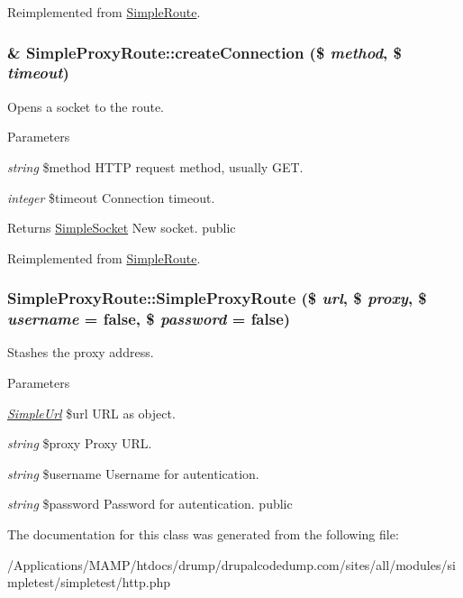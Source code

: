 Reimplemented from \hyperlink{class_simple_route_a7480c99e9ebcac13f1d84b4eb676f02d}{SimpleRoute}.\hypertarget{class_simple_proxy_route_a1741241e4a4d7ed555adf373008c7cf0}{
\subsubsection[{createConnection}]{\setlength{\rightskip}{0pt plus 5cm}\& SimpleProxyRoute::createConnection (\$ {\em method}, \/  \$ {\em timeout})}}
\label{class_simple_proxy_route_a1741241e4a4d7ed555adf373008c7cf0}
Opens a socket to the route. 
\begin{DoxyParams}{Parameters}
\item[{\em string}]\$method HTTP request method, usually GET. \item[{\em integer}]\$timeout Connection timeout. \end{DoxyParams}
\begin{DoxyReturn}{Returns}
\hyperlink{class_simple_socket}{SimpleSocket} New socket.  public 
\end{DoxyReturn}


Reimplemented from \hyperlink{class_simple_route_a686424eff035f1a37bbf13e997a072af}{SimpleRoute}.\hypertarget{class_simple_proxy_route_ae9dd2dbfe339569ce5fb6a68162de1a9}{
\subsubsection[{SimpleProxyRoute}]{\setlength{\rightskip}{0pt plus 5cm}SimpleProxyRoute::SimpleProxyRoute (\$ {\em url}, \/  \$ {\em proxy}, \/  \$ {\em username} = {\ttfamily false}, \/  \$ {\em password} = {\ttfamily false})}}
\label{class_simple_proxy_route_ae9dd2dbfe339569ce5fb6a68162de1a9}
Stashes the proxy address. 
\begin{DoxyParams}{Parameters}
\item[{\em \hyperlink{class_simple_url}{SimpleUrl}}]\$url URL as object. \item[{\em string}]\$proxy Proxy URL. \item[{\em string}]\$username Username for autentication. \item[{\em string}]\$password Password for autentication.  public \end{DoxyParams}


The documentation for this class was generated from the following file:\begin{DoxyCompactItemize}
\item 
/Applications/MAMP/htdocs/drump/drupalcodedump.com/sites/all/modules/simpletest/simpletest/http.php\end{DoxyCompactItemize}
